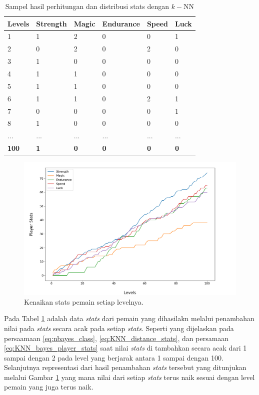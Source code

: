 \begin{longtable}{|l|l|l|l|l|l|}
	\caption{Sampel hasil perhitungan dan distribusi stats dengan $k-$NN}
	\label{tb:player_battle_stats}\\
	\hline
	\rowcolor[HTML]{C0C0C0} 
	\textbf{Levels} & \textbf{Strength} & \textbf{Magic} & \textbf{Endurance} & \textbf{Speed} & \textbf{Luck} \\ \hline
	1 & 1 & 2 & 0 & 0 & 1 \\ \hline
	2 & 0 & 2 & 0 & 2 & 0 \\ \hline
	3 & 1 & 0 & 0 & 0 & 0 \\ \hline
	4 & 1 & 1 & 0 & 0 & 0 \\ \hline
	5 & 1 & 1 & 0 & 0 & 0 \\ \hline
	6 & 1 & 1 & 0 & 2 & 1 \\ \hline
	7 & 0 & 0 & 0 & 0 & 1 \\ \hline
	8 & 1 & 0 & 0 & 0 & 0 \\ \hline
	... & ... & ... & ... & ... & ... \\ \hline
	\textbf{100} & \textbf{1} & \textbf{0} & \textbf{0} & \textbf{0} & \textbf{0} \\ \hline
\end{longtable}

\begin{figure} [!h] \centering
	\includegraphics[scale=0.50]{img/PlayerStatsDistrib.png}
	\caption{Kenaikan stats pemain setiap levelnya.}
	\label{fig:stats_player}
\end{figure}

Pada Tabel \ref{tb:player_battle_stats} adalah data \textit{stats} dari pemain yang dihasilakn melalui penambahan nilai pada \textit{stats} secara acak pada setiap \textit{stats}. Seperti yang dijelaskan pada persaamaan \ref{eq:nbayes_class}, \ref{eq:KNN_distance_stats}, dan persamaan \ref{eq:KNN_bayes_player_stats} saat nilai \textit{stats} di tambahkan secara acak dari 1 sampai dengan 2 pada level yang berjarak antara 1 sampai dengan 100. Selanjutnya representasi dari hasil penambahan \textit{stats} tersebut yang ditunjukan melalui Gambar \ref{fig:stats_player} yang mana nilai dari setiap \textit{stats} terus naik sesuai dengan level pemain yang juga terus naik. 
\vspace{1ex}

